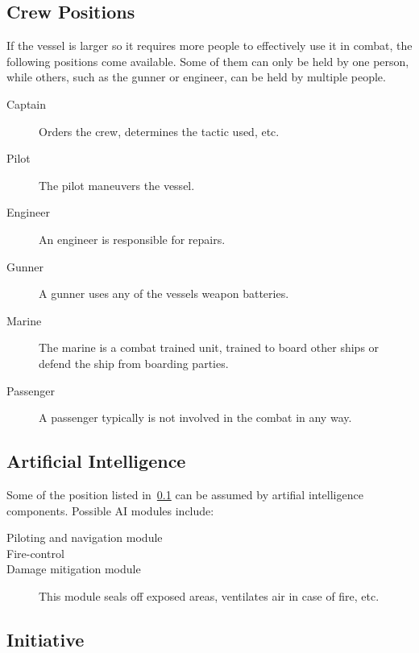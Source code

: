 \subsection{Crew Positions}
\label{sub:Vessels-Combat-Setup-Crew-Positions}

If the vessel is larger so it requires more people to effectively use it in combat, the following positions come available. Some of them can only be held by one person, while others, such as the gunner or engineer, can be held by multiple people.

\begin{description}
  \item[Captain] Orders the crew, determines the tactic used, etc.
  \item[Pilot] The pilot maneuvers the vessel.
  \item[Engineer] An engineer is responsible for repairs.
  \item[Gunner] A gunner uses any of the vessels weapon batteries.
  \item[Marine] The marine is a combat trained unit, trained to board other ships or defend the ship from boarding parties.
  \item[Passenger] A passenger typically is not involved in the combat in any way.
\end{description}

\subsection{Artificial Intelligence}
\label{sub:Vessels-Combat-Setup-Artificial-Intelligence}

Some of the position listed in~\ref{sub:Vessels-Combat-Setup-Crew-Positions} can be assumed by artifial intelligence components. Possible AI modules include:

\begin{description}
  \item[Piloting and navigation module]
  \item[Fire-control]
  \item[Damage mitigation module] This module seals off exposed areas, ventilates air in case of fire, etc.
\end{description}

\subsection{Initiative}
\label{sub:Vessels-Combat-Setup-Initiative}

